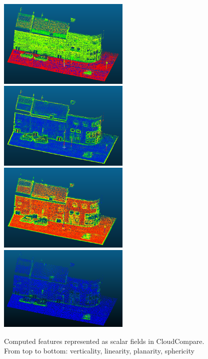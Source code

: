 \documentclass[10pt,a4paper]{article}
\begin{document}
\begin{figure}[h!]
	\centering
	\includegraphics[width=0.56\textwidth]{verticality.png}
	\includegraphics[width=0.56\textwidth]{linearity.png}
	\includegraphics[width=0.56\textwidth]{planarity.png}
	\includegraphics[width=0.56\textwidth]{sphericity.png}
	\caption{Computed features represented as scalar fields in CloudCompare. From top to bottom: verticality, linearity, planarity, sphericity}
	\label{fig:features}
\end{figure}
\end{document}
